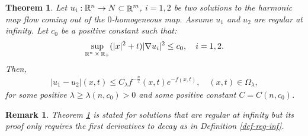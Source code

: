 \documentclass[a4paper,11pt,reqno]{amsart}
\newtheorem{theo}[defn]{Theorem}
\newtheorem{rk}[defn]{Remark}
\def\R{\mathop{\rm \mathbb{R}}\nolimits}
\begin{document}
\begin{theo}\label{prop-dec-time-diff-sol}
Let $u_i:\mathbb{R}^n\rightarrow N\subset \R^m$, $i=1,2$ be two solutions to the harmonic map flow coming out of the $0$-homogeneous map. Assume $u_1$ and $u_2$ are regular at infinity. Let $c_0$ be a positive constant such that: 
\begin{eqnarray*}
\sup_{\R^n\times\R_+}(|x|^2+t)|\nabla u_i|^2\leq c_0,\quad i=1,2.
\end{eqnarray*}
Then,
\begin{eqnarray}
|u_1-u_2|(x,t)\leq C_{\lambda}f^{-\frac{n}{2}}(x,t)e^{-f(x,t)},\quad (x,t)\in \Omega_{\lambda},\label{fast-decay-diff-sol}
\end{eqnarray}
 for some positive $\lambda\geq \lambda(n,c_0)>0$ and some positive constant $C=C\left(n,c_0\right)$.
\end{theo}
\begin{rk}
Theorem \ref{prop-dec-time-diff-sol} is stated for solutions that are regular at infinity but its proof only requires the first derivatives to decay as in Definition \ref{def-reg-inf}.
\end{rk}
\end{document}
